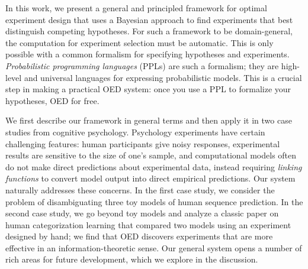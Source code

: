 \documentclass{article}
\newcommand{\ndg}[1]{\textcolor{Green}{[ndg: #1]}}
\begin{document}
In this work, we present a general and principled framework for optimal experiment design that uses a Bayesian approach to find experiments that best distinguish competing hypotheses.
For such a framework to be domain-general, the computation for experiment selection must be automatic.
This is only possible with a common formalism for specifying hypotheses and experiments.
\emph{Probabilistic programming languages} (PPLs) are such a formalism; they are high-level and universal languages for expressing probabilistic models.
This is a crucial step in making a practical OED system: once you use a PPL to formalize your hypotheses, OED for free.

We first describe our framework in general terms and then apply it in two case studies from cognitive psychology.
Psychology experiments have certain challenging features: human participants give noisy responses, experimental results are sensitive to the size of one's sample, and computational models often do not make direct predictions about experimental data, instead requiring \emph{linking functions} to convert model output into direct empirical predictions.
Our system naturally addresses these concerns.
In the first case study, we consider the problem of disambiguating three toy models of human sequence prediction.
In the second case study, we go beyond toy models and analyze a classic paper on human categorization learning that compared two models using an experiment designed by hand; we find that OED discovers experiments that are more effective in an information-theoretic sense.
Our general system opens a number of rich areas for future development, which we explore in the discussion.

\end{document}
